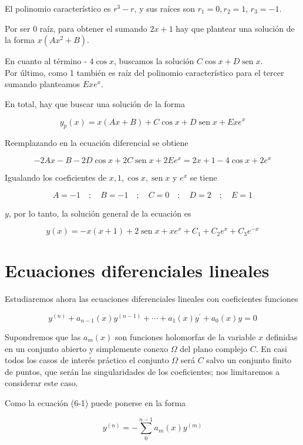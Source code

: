 \documentclass[10pt]{article}
\theoremstyle{plain}
\theoremstyle{definition}
\theoremstyle{remark}
\begin{document}
El polinomio característico es $r^{3}-r$, y sus raíces son $r_{1}=0, r_{2}=1$, $r_{3}=-1$.

Por ser 0 raíz, para obtener el sumando $2 x+1$ hay que plantear una solución de la forma $x\left(A x^{2}+B\right)$.

En cuanto al término - $4 \cos x$, buscamos la solución $C \cos x+D \operatorname{sen} x$.\\
Por último, como 1 también es raíz del polinomio característico para el tercer sumando planteamos $E x e^{x}$.

En total, hay que buscar una solución de la forma

$$
y_{p}(x)=x(A x+B)+C \cos x+D \operatorname{sen} x+E x e^{x}
$$

Reemplazando en la ecuación diferencial se obtiene

$$
-2 A x-B-2 D \cos x+2 C \operatorname{sen} x+2 E e^{x}=2 x+1-4 \cos x+2 e^{x}
$$

Igualando los coeficientes de $x, 1, \cos x, \operatorname{sen} x$ y $e^{x}$ se tiene

$$
A=-1 \quad ; \quad B=-1 \quad ; \quad C=0 \quad ; \quad D=2 \quad ; \quad E=1
$$

$y$, por lo tanto, la solución general de la ecuación es

$$
y(x)=-x(x+1)+2 \operatorname{sen} x+x e^{x}+C_{1}+C_{2} e^{x}+C_{3} e^{-x}
$$

\section{Ecuaciones diferenciales lineales}
Estudiaremos ahora las ecuaciones diferenciales lineales con coeficientes funciones


\begin{equation*}
y^{(n)}+a_{n-1}(x) y^{(n-1)}+\cdots+a_{1}(x) y^{\prime}+a_{0}(x) y=0 \tag{6-1}
\end{equation*}


Supondremos que las $a_{m}(x)$ son funciones holomorfas de la variable $x$ definidas en un conjunto abierto y simplemente conexo $\Omega$ del plano complejo $C$. En casi todos los casos de interés práctico el conjunto $\Omega$ será $C$ salvo un conjunto finito de puntos, que serán las singularidades de los coeficientes; nos limitaremos a considerar este caso.

Como la ecuación (6-1) puede ponerse en la forma


\begin{equation*}
y^{(n)}=-\sum_{0}^{n-1} a_{m}(x) y^{(m)} \tag{6-1}
\end{equation*}
\end{document}
